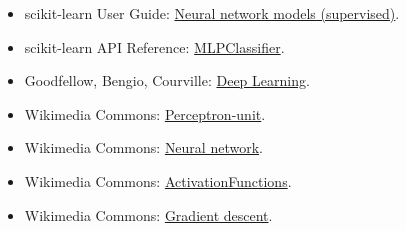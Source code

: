 \begin{itemize}
    \item scikit-learn User Guide:
    \href{https://scikit-learn.org/stable/modules/neural\_networks\_supervised.html}{Neural network models
    (supervised)}.
    \item scikit-learn API Reference:
    \href{https://scikit-learn.org/stable/modules/generated/sklearn.neural\_network.MLPClassifier.html}{MLPClassifier}.
    \item Goodfellow, Bengio, Courville:
    \href{https://www.deeplearningbook.org/}{Deep Learning}.
    \item Wikimedia Commons:
    \href{https://commons.wikimedia.org/wiki/File:Perceptron-unit.svg}{Perceptron-unit}.
    \item Wikimedia Commons:
    \href{https://commons.wikimedia.org/wiki/File:Neural\_network.svg}{Neural network}.
    \item Wikimedia Commons:
    \href{https://commons.wikimedia.org/wiki/File:ActivationFunctions.svg}{ActivationFunctions}.
    \item Wikimedia Commons:
    \href{https://commons.wikimedia.org/wiki/File:Gradient\_descent.svg}{Gradient descent}.
\end{itemize}

\newpage
